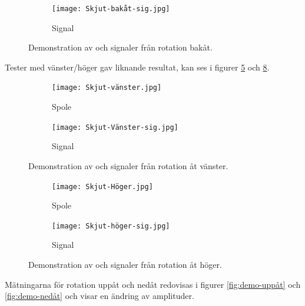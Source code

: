 \documentclass[a4paper]{article}
\begin{document}
\begin{sloppypar}
\begin{figure}[H]
\begin{subfigure}[b]{0.45\textwidth}
        \end{subfigure}
        \hfill
        \begin{subfigure}[b]{0.45\textwidth}
            \centering
            \texttt{[image: Skjut-bakåt-sig.jpg]}
            \caption{Signal}
            \label{fig:signal-bakåt}
        \end{subfigure}
        \caption{Demonstration av och signaler från rotation bakåt.}
        \label{fig:demo-bakåt}
    \end{figure}

    \noindent
    Tester med vänster/höger gav liknande resultat, kan ses i figurer \ref{fig:demo-vänster} och \ref{fig:demo-höger}.

    \begin{figure}[H]
        \centering
        \begin{subfigure}[b]{0.45\textwidth}
            \centering
            \texttt{[image: Skjut-vänster.jpg]}
            \caption{Spole}
            \label{fig:spole-vänster}

        \end{subfigure}
        \hfill
        \begin{subfigure}[b]{0.45\textwidth}
            \centering
            \texttt{[image: Skjut-Vänster-sig.jpg]}
            \caption{Signal}
            \label{fig:signal-vänster}
        \end{subfigure}
        \caption{Demonstration av och signaler från rotation åt vänster.}
        \label{fig:demo-vänster}
    \end{figure}
    \begin{figure}[H]
        \centering
        \begin{subfigure}[b]{0.45\textwidth}
            \centering
            \texttt{[image: Skjut-Höger.jpg]}
            \caption{Spole}
            \label{fig:spole-höger}

        \end{subfigure}
        \hfill
        \begin{subfigure}[b]{0.45\textwidth}
            \centering
            \texttt{[image: Skjut-höger-sig.jpg]}
            \caption{Signal}
            \label{fig:signal-höger}
        \end{subfigure}
        \caption{Demonstration av och signaler från rotation åt höger.}
        \label{fig:demo-höger}
    \end{figure}

    \noindent
    Mätningarna för rotation uppåt och nedåt redovisas i figurer \ref{fig:demo-uppåt} och \ref{fig:demo-nedåt} och visar en ändring av amplituder.


\end{sloppypar}
\end{document}
